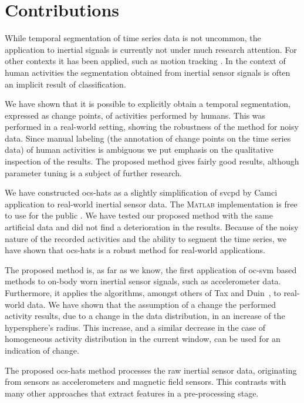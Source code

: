 \section{Contributions}\label{sec:main_findings}
While temporal segmentation of time series data is not uncommon, the application to inertial signals is currently not under much research attention.
For other contexts it has been applied, such as motion tracking \cite{barbivc2004segmenting,li2007segmentation}.
In the context of human activities the segmentation obtained from inertial sensor signals is often an implicit result of classification.

We have shown that it is possible to explicitly obtain a temporal segmentation, expressed as change points, of activities performed by humans.
This was performed in a real-world setting, showing the robustness of the method for noisy data.
Since manual labeling (the annotation of change points on the time series data) of human activities is ambiguous we put emphasis on the qualitative inspection of the results.
The proposed method gives fairly good results, although parameter tuning is a subject of further research.

We have constructed \gls{ocs-hats} as a slightly simplification of \gls{svcpd} by Camci~\cite{camci2010change} application to real-world inertial sensor data.
The \textsc{Matlab} implementation is free to use for the public \cite{vlasveld2014hats}.
We have tested our proposed method with the same artificial data and did not find a deterioration in the results.
Because of the noisy nature of the recorded activities and the ability to segment the time series, we have shown that \gls{ocs-hats} is a robust method for real-world applications.

The proposed method is, as far as we know, the first application of \gls{oc-svm} based methods to on-body worn inertial sensor signals, such as accelerometer data.
Furthermore, it applies the algorithms, amongst others of Tax and Duin~\cite{tax1999support}, to real-world data.
We have shown that the assumption of a change the performed activity results, due to a change in the data distribution, in an increase of the hypersphere's radius.
This increase, and a similar decrease in the case of homogeneous activity distribution in the current window, can be used for an indication of change.

The proposed \gls{ocs-hats} method processes the raw inertial sensor data, originating from sensors as accelerometers and magnetic field sensors.
This contrasts with many other approaches that extract features in a pre-processing stage.

